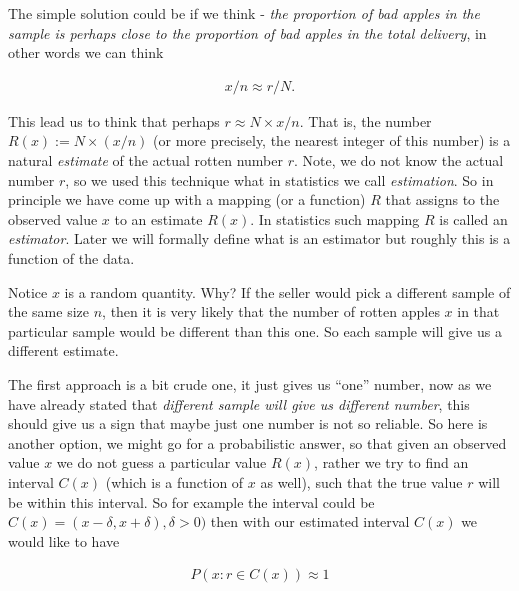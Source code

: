 \documentclass[ 11pt,%
				a4paper,%
				twoside,%
				headinclude,%
				footinclude = true,%
				cleardoublepage = empty,%
				reqno]{scrbook}
\begin{document}
\begin{example}
{}



\textbf{}

         The simple solution could be if we think - \textit{the proportion of bad apples in the sample is perhaps close to the proportion of bad apples in the total delivery}, in other words we can think 

         \begin{align*}
             x / n \approx r / N .
         \end{align*}

         This lead us to think that perhaps $r \approx N \times x/n$. That is, the number ${R(x) := N \times (x / n)}$ (or more precisely, the nearest integer of this number) is a natural \emph{estimate} of the actual rotten number $r$. Note, we do not know the actual number $r$, so we used this technique what in statistics we call \emph{estimation}. So in principle we have come up with a mapping (or a function) $R$ that assigns to the observed value $x$ to an estimate $R(x)$. In statistics such mapping $R$ is called an \emph{estimator}. Later we will formally define what is an estimator but roughly this is a function of the data.

         Notice $x$ is a random quantity. Why? If the seller would pick a different sample of the same size $n$, then it is very likely that the number of rotten apples $x$ in that particular sample would be different than this one. So each sample will give us a different estimate. 

\textbf{}

        The first approach is a bit crude one, it just gives us ``one'' number, now as we have already stated that \emph{different sample will give us different number}, this should give us a sign that maybe just one number is not so reliable. So here is another option, we might go for a probabilistic answer, so that given an observed value $x$ we do not guess a particular value $R(x)$, rather we try to find an interval $C(x)$ (which is a function of $x$ as well), such that the true value $r$ will be within this interval. So for example the interval could be $C(x) =(x-\delta, x+ \delta), \delta>0)$ then with our estimated interval $C(x)$ we would like to have 

        \begin{align}\label{eqn:ci}
            P(x: r \in C(x)) \approx 1
        \end{align}



\end{example}
\end{document}
